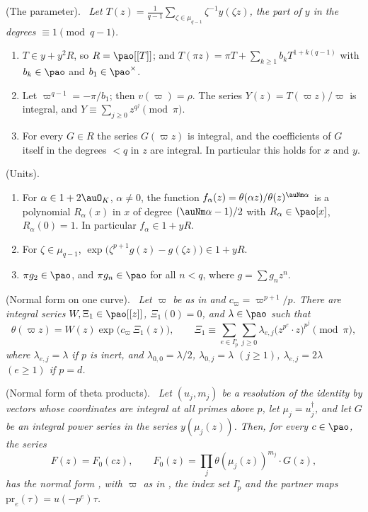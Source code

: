 \documentclass[10pt]{amsart}
\theoremstyle{definition}
\theoremstyle{remark}
\providecommand{\paI}{I_p^{\circ}}
\providecommand{\pavp}{\varpi}
\newenvironment{quotedthm}[2]{\par\medskip\noindent\begingroup
  \textbf{#1}#2.\ \itshape\ignorespaces}{\endgroup\par\medskip}
\begin{document}
\begin{quotedthm}{\cite[Lemma~4.6]{P49}}{ (The parameter)}
Let $T(z)=\frac1{q-1}\sum_{\zeta\in\mu_{q-1}}\zeta^{-1}y(\zeta z)$, the part of $y$ in the degrees
$\equiv1\pmod{q-1}$.
\begin{enumerate}
\item[(a)] $T\in y+y^2R$, so $R=\pao[[T]]$; and $T(\pi z)=\pi T+\sum_{k\ge1}b_kT^{1+k(q-1)}$ with
$b_k\in\pao$ and $b_1\in\pao^\times$.
\item[(b)] Let $\pavp^{q-1}=-\pi/b_1$; then $v(\pavp)=\rho$. The series $Y(z)=T(\pavp z)/\pavp$ is
integral, and $Y\equiv\sum_{j\ge0}z^{q^j}\pmod\pi$.
\item[(c)] For every $G\in R$ the series $G(\pavp z)$ is integral, and the coefficients of $G$
itself in the degrees $<q$ in $z$ are integral. In particular this holds for $x$ and $y$.
\end{enumerate}
\end{quotedthm}

\begin{quotedthm}{\cite[Lemma~4.7]{P49}}{ (Units)}
\begin{enumerate}
\item[(a)] For $\alpha\in1+2\auO_K$, $\alpha\ne0$, the function $f_\alpha(z)=\theta(\alpha z)/
\theta(z)^{\auNm\alpha}$ is a polynomial $R_\alpha(x)$ in $x$ of degree $(\auNm\alpha-1)/2$ with
$R_\alpha\in\pao[x]$, $R_\alpha(0)=1$. In particular $f_\alpha\in1+yR$.
\item[(b)] For $\zeta\in\mu_{q-1}$, $\exp\bigl(\zeta^{p+1}g(z)-g(\zeta z)\bigr)\in1+yR$.
\item[(c)] $\pi g_2\in\pao$, and $\pi g_n\in\pao$ for all $n<q$, where $g=\sum g_nz^n$.
\end{enumerate}
\end{quotedthm}

\begin{quotedthm}{\cite[Theorem~4.9]{P49}}{ (Normal form on one curve)}
Let $\pavp$ be as in {\cite[Lemma~4.6(b)]{P49}} and $c_\pavp=\pavp^{p+1}/p$. There are integral series
$W,\Xi_1\in\pao[[z]]$, $\Xi_1(0)=0$, and $\lambda\in\pao$ such that
\[
\theta(\pavp z)=W(z)\exp\bigl(c_\pavp\,\Xi_1(z)\bigr),\qquad
\Xi_1\equiv\sum_{e\in\paI}\sum_{j\ge0}\lambda_{e,j}\bigl(z^{p^e}\cdot z\bigr)^{p^j}\pmod\pi ,
\]
where $\lambda_{e,j}=\lambda$ if $p$ is inert, and $\lambda_{0,0}=\lambda/2$,
$\lambda_{0,j}=\lambda$ $(j\ge1)$, $\lambda_{e,j}=2\lambda$ $(e\ge1)$ if $p=d$.
\end{quotedthm}

\begin{quotedthm}{\cite[Proposition~4.12]{P49}}{ (Normal form of theta products)}
Let $(u_j,m_j)$ be a resolution of the identity by vectors whose coordinates are integral at all
primes above $p$, let $\mu_j=u_j^\dagger$, and let $G$ be an integral power series in the series
$y(\mu_j(z))$. Then, for every $c\in\pao$, the series
\[
F(z)=F_0(cz),\qquad F_0(z)=\prod_j\theta(\mu_j(z))^{m_j}\cdot G(z),
\]
has the normal form {\cite[(20)]{P49}}, with $\pavp$ as in {\cite[Lemma~4.6(b)]{P49}}, the index set
$\paI$ and the partner maps $\mathrm{pr}_e(\tau)=u(-p^e)\tau$.
\end{quotedthm}
\end{document}
